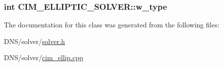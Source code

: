 \subsubsection[{\texorpdfstring{w\+\_\+type}{w_type}}]{\setlength{\rightskip}{0pt plus 5cm}int C\+I\+M\+\_\+\+E\+L\+L\+I\+P\+T\+I\+C\+\_\+\+S\+O\+L\+V\+E\+R\+::w\+\_\+type}\hypertarget{class_c_i_m___e_l_l_i_p_t_i_c___s_o_l_v_e_r_aeb6503ac93062f9692671d5cfc993969}{}\label{class_c_i_m___e_l_l_i_p_t_i_c___s_o_l_v_e_r_aeb6503ac93062f9692671d5cfc993969}


The documentation for this class was generated from the following files\+:\begin{DoxyCompactItemize}
\item 
D\+N\+S/solver/\hyperlink{solver_8h}{solver.\+h}\item 
D\+N\+S/solver/\hyperlink{cim__ellip_8cpp}{cim\+\_\+ellip.\+cpp}\end{DoxyCompactItemize}
